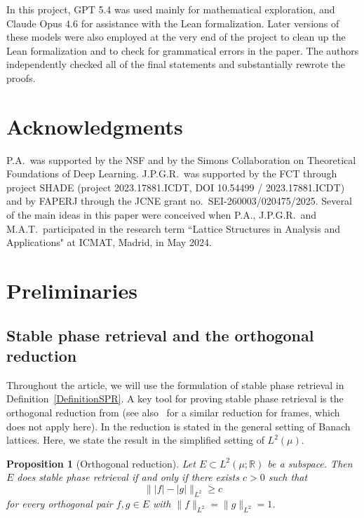 \documentclass[11pt]{amsart}
\numberwithin{equation}{section}
\newtheorem{proposition}[theorem]{Proposition}
\theoremstyle{definition}
\newtheorem{definition}[theorem]{Definition}
\theoremstyle{remark}
\newcommand{\abs}[1]{\lvert #1 \rvert}
\newcommand{\norm}[1]{\lVert #1 \rVert}
\begin{document}
In this project, GPT 5.4 was used mainly for mathematical exploration, and Claude Opus 4.6 for assistance with the Lean formalization. Later versions of these models were also employed at the very end of the project to clean up the Lean formalization and to check for grammatical errors in the paper. The authors independently checked all of the final statements and  substantially rewrote the proofs. 
\section*{Acknowledgments} 
P.A.~was supported by the NSF and by the Simons Collaboration on Theoretical Foundations of Deep Learning. J.P.G.R.~was supported by the FCT through project SHADE (project 2023.17881.ICDT, DOI  10.54499 / 2023.17881.ICDT) and by FAPERJ through the JCNE grant no.~SEI-260003/020475/2025. Several of the main ideas in this paper were conceived when P.A., J.P.G.R.~and M.A.T.~participated in the research term ``Lattice Structures in Analysis and Applications" at ICMAT, Madrid, in May 2024.

\section{Preliminaries}\label{sec:preliminaries}

\subsection{Stable phase retrieval and the orthogonal reduction} Throughout the article, we will use the formulation of stable phase retrieval in Definition~\ref{DefinitionSPR}. A key tool for proving stable phase retrieval is the orthogonal reduction from \cite[Theorem~3.9]{FOTP} (see also~\cite[Theorem~2.1]{localphase} for a similar reduction for frames, which does not apply here). In \cite[Theorem~3.9]{FOTP} the reduction is stated in the general setting of Banach lattices. Here, we state the result in the simplified setting of $L^2(\mu)$. 



\begin{proposition}[Orthogonal reduction]\label{prop:orth-reduction}
Let $E\subset L^2(\mu;\mathbb{R})$ be a subspace. Then $E$
does stable phase retrieval if and only if there exists $c>0$ such that
\[
\norm{\abs{f}-\abs{g}}_{L^2}\ge c
\]
for every orthogonal pair $f,g\in E$ with $\norm{f}_{L^2}=\norm{g}_{L^2}=1$. 
\end{proposition}
\end{document}
